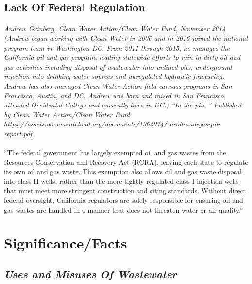 \documentclass{article}
\begin{document}
\subsection{Lack Of Federal Regulation}
\paragraph{}
\small
\textit{  
\underline{Andrew Grinberg, Clean Water Action/Clean Water Fund, November 2014}
  (Andrew began working with Clean Water in 2006 and in 2016 joined the national program team in Washington DC. From 2011 through 2015, he managed the California oil and gas program, leading statewide efforts to rein in dirty oil and gas activities including disposal of wastewater into unlined pits, underground injection into drinking water sources and unregulated hydraulic fracturing. Andrew has also managed Clean Water Action field canvass programs in San Francisco, Austin, and DC. Andrew was born and raised in San Francisco, attended Occidental College and currently lives in DC.) “In the pits ” Published by Clean Water Action/Clean Water Fund 
\url{https://assets.documentcloud.org/documents/1362974/ca-oil-and-gas-pit-report.pdf} }
\normalsize
\paragraph{}
``The federal government has largely exempted oil and gas wastes from the Resources Conservation and Recovery Act (RCRA), leaving each state to regulate its own oil and gas waste. This exemption also allows oil and gas waste disposal into class II wells, rather than the more tightly regulated class I injection wells that must meet more stringent construction and siting standards. Without direct federal oversight, California regulators are solely responsible for ensuring oil and gas wastes are handled in a manner that does not threaten water or air quality.''

\section{Significance/Facts}

\subsection{\emph{Uses and Misuses Of Wastewater}}
\end{document}
